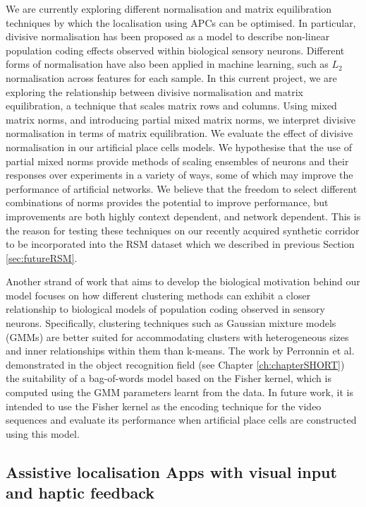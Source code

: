 We are currently exploring different normalisation and matrix equilibration techniques by which the localisation using APCs can be optimised. In particular, divisive normalisation has been proposed as a model to describe non-linear population coding effects observed within biological sensory neurons. Different forms of normalisation have also been applied in machine learning, such as $L_2$ normalisation across features for each sample. In this current project, we are exploring the relationship between divisive normalisation and matrix equilibration, a technique that scales matrix rows and columns. Using mixed matrix norms, and introducing partial mixed matrix norms, we interpret divisive normalisation in terms of matrix equilibration. We evaluate the effect of divisive normalisation in our artificial place cells models. We hypothesise that the use of partial mixed norms provide methods of scaling ensembles of neurons and their responses over experiments in a variety of ways, some of which may improve the performance of artificial networks. We believe that the freedom to select different combinations of norms provides the potential to improve performance, but improvements are both highly context dependent, and network dependent. This is the reason for testing these techniques on our recently acquired synthetic corridor to be incorporated into the RSM dataset which we described in previous Section \ref{sec:futureRSM}.


Another strand of work that aims to develop the biological motivation behind our model focuses on how different clustering methods can exhibit a closer relationship to biological models of population coding observed in sensory neurons. Specifically, clustering techniques such as Gaussian mixture models (GMMs) are better suited for accommodating clusters with heterogeneous sizes and inner relationships within them than k-means. The work by Perronnin et al. \cite{ perronnin2007fisher, Perronnin2010, Jegou2012} demonstrated in the object recognition field (see Chapter \ref{ch:chapterSHORT}) the suitability of a bag-of-words model based on the Fisher kernel, which is computed using the GMM parameters learnt from the data. In future work, it is intended to use the Fisher kernel as the encoding technique for the video sequences and evaluate its performance when artificial place cells are constructed using this model.

\subsection{Assistive localisation Apps with visual input and haptic feedback}

